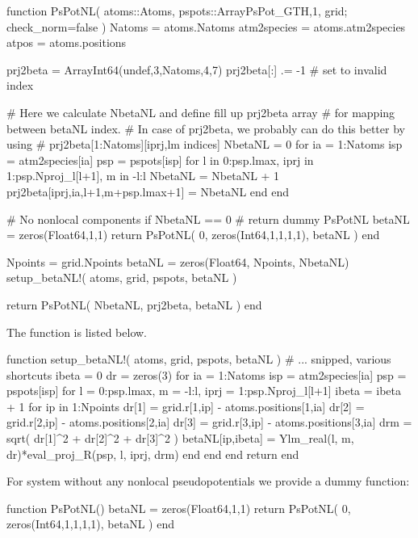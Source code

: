 \begin{juliacode}
function PsPotNL( atoms::Atoms, pspots::Array{PsPot_GTH,1}, grid; check_norm=false )
    Natoms = atoms.Natoms
    atm2species = atoms.atm2species
    atpos = atoms.positions

    prj2beta = Array{Int64}(undef,3,Natoms,4,7)
    prj2beta[:] .= -1   # set to invalid index

    # Here we calculate NbetaNL and define fill up prj2beta array
    # for mapping between betaNL index.
    # In case of prj2beta, we probably can do this better by using
    # prj2beta[1:Natoms][iprj,lm indices]
    NbetaNL = 0
    for ia = 1:Natoms
        isp = atm2species[ia]
        psp = pspots[isp]
        for l in 0:psp.lmax, iprj in 1:psp.Nproj_l[l+1], m in -l:l
            NbetaNL = NbetaNL + 1
            prj2beta[iprj,ia,l+1,m+psp.lmax+1] = NbetaNL
        end
    end

    # No nonlocal components
    if NbetaNL == 0
        # return dummy PsPotNL
        betaNL = zeros(Float64,1,1)
        return PsPotNL( 0, zeros(Int64,1,1,1,1), betaNL )
    end

    Npoints = grid.Npoints
    betaNL = zeros(Float64, Npoints, NbetaNL)
    setup_betaNL!( atoms, grid, pspots, betaNL )

    return PsPotNL( NbetaNL, prj2beta, betaNL )
end
\end{juliacode}

The function  is listed below.
\begin{juliacode}
function setup_betaNL!( atoms, grid, pspots, betaNL )
    # ... snipped, various shortcuts
    ibeta = 0
    dr = zeros(3)
    for ia = 1:Natoms
        isp = atm2species[ia]
        psp = pspots[isp]
        for l = 0:psp.lmax, m = -l:l, iprj = 1:psp.Nproj_l[l+1]
            ibeta = ibeta + 1
            for ip in 1:Npoints
                dr[1] = grid.r[1,ip] - atoms.positions[1,ia]
                dr[2] = grid.r[2,ip] - atoms.positions[2,ia]
                dr[3] = grid.r[3,ip] - atoms.positions[3,ia]
                drm = sqrt( dr[1]^2 + dr[2]^2 + dr[3]^2 )
                betaNL[ip,ibeta] = Ylm_real(l, m, dr)*eval_proj_R(psp, l, iprj, drm)
            end
        end
    end
    return
end
\end{juliacode}

For system without any nonlocal pseudopotentials we provide a dummy function:
\begin{juliacode}
function PsPotNL()
  betaNL = zeros(Float64,1,1)
  return PsPotNL( 0, zeros(Int64,1,1,1,1), betaNL )
end
\end{juliacode}

